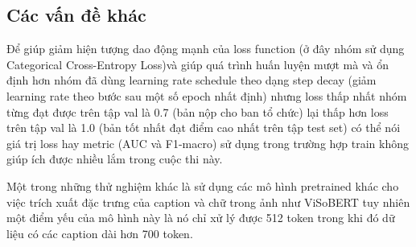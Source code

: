 \documentclass[11pt]{article}
\begin{document}
\subsection{Các vấn đề khác}
\hspace*{5mm}Để giúp giảm hiện tượng dao động mạnh của loss function (ở đây nhóm sử dụng Categorical Cross-Entropy Loss)và giúp quá trình huấn luyện mượt mà và ổn định hơn nhóm đã dùng learning rate schedule theo dạng step decay (giảm learning rate theo bước sau một số epoch nhất định) nhưng loss thấp nhất nhóm từng đạt được trên tập val là 0.7 (bản nộp cho ban tổ chức) lại thấp hơn loss trên tập val là 1.0 (bản tốt nhất đạt điểm cao nhất trên tập test set) có thể nói giá trị loss hay metric (AUC và F1-macro) sử dụng trong trường hợp train không giúp ích được nhiều lắm trong cuộc thi này.

Một trong những thử nghiệm khác là sử dụng các mô hình pretrained khác cho việc trích xuất đặc trưng của caption và chữ trong ảnh như ViSoBERT\cite{visobert} tuy nhiên một điểm yếu của mô hình này là nó chỉ xử lý được 512 token trong khi đó dữ liệu có các caption dài hơn 700 token. 
\end{document}

